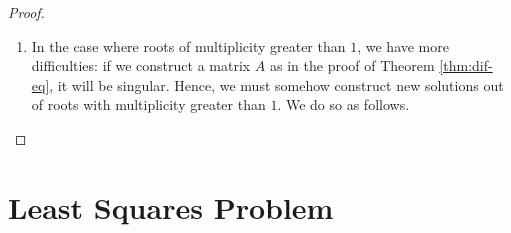 \documentclass[12pt,reqno]{amsart}
\numberwithin{equation}{section}  %
\newcommand{\rr}{\mathbb{R}}
\begin{document}
\begin{proof}
\begin{enumerate}
non-zero, via induction. For the base case, we consider the $1 \times 1$
sub-matrix $[\lambda_m^m]$, which has non-zero determinant (we assumed
a priori that the $\lambda_i$ are non-zero). For the inductive step,
we assume the sub-matrix with diagonal entries $\lambda_2^2$ to $\lambda_m^m$ has non-zero
determinant. Then it is easy to see that $A$ has non-zero determinant by taking
its principal minor at $\lambda_1$. 
Since A is a map from $\rr^m$ to itself, it follows that dimension of the nullspace of $A$ is $0$. Hence, $A$ is
non-singular, and so completely determines the $a_i$, for $1 \le i \le m$. We
can repeat the argument to obtain the next $m$ constants $a_i$. A simple 
induction completes the proof. 
\item
In the case where roots of multiplicity greater than $1$, we have more
difficulties: if we construct a matrix $A$ as in the proof of
Theorem \ref{thm:dif-eq}, it will be singular. Hence, we must somehow construct
new solutions out of roots with multiplicity greater than $1$. We do so as
follows.
\qedhere
\end{enumerate}
\end{proof}


\section{Least Squares Problem}
\end{document}

